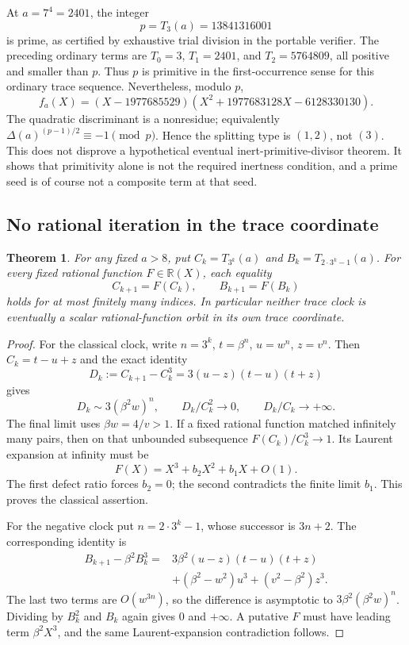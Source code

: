 \documentclass[11pt,a4paper]{article}
\newtheorem{theorem}{Theorem}[section]
\theoremstyle{definition}\newtheorem{definition}[theorem]{Definition}
\theoremstyle{remark}\newtheorem{remark}[theorem]{Remark}
\newcommand{\R}{\mathbb R}\newcommand{\C}{\mathbb C}\newcommand{\F}{\mathbb F}
\begin{document}
At $a=7^4=2401$, the integer
\[
 p=T_3(a)=13841316001
\]
is prime, as certified by exhaustive trial division in the portable
verifier. The preceding ordinary terms are
$T_0=3$, $T_1=2401$, and $T_2=5764809$, all positive and smaller than
$p$. Thus $p$ is primitive in the first-occurrence sense for this
ordinary trace sequence. Nevertheless, modulo $p$,
\begin{equation}\label{R16:eq:mixedexample}
 f_a(X)=(X-1977685529)
 (X^2+1977683128X-6128330130).
\end{equation}
The quadratic discriminant is a nonresidue; equivalently
$\Delta(a)^{(p-1)/2}\equiv-1\pmod p$. Hence the splitting type is
$(1,2)$, not $(3)$. This does not disprove a hypothetical eventual
inert-primitive-divisor theorem. It shows that primitivity alone is not
the required inertness condition, and a prime seed is of course not a
composite term at that seed.

\subsection{No rational iteration in the trace coordinate}

\begin{theorem}\label{R16:thm:rational}
For any fixed $a>8$, put $C_k=T_{3^k}(a)$ and
$B_k=T_{2\cdot3^k-1}(a)$. For every fixed rational function
$F\in\R(X)$, each equality
\[
 C_{k+1}=F(C_k),\qquad B_{k+1}=F(B_k)
\]
holds for at most finitely many indices. In particular neither trace clock
is eventually a scalar rational-function orbit in its own trace coordinate.
\end{theorem}
\begin{proof}
For the classical clock, write $n=3^k$, $t=\beta^n$, $u=w^n$,
$z=v^n$. Then $C_k=t-u+z$ and the exact identity
\begin{equation}\label{R16:eq:defect}
 D_k:=C_{k+1}-C_k^3=3(u-z)(t-u)(t+z)
\end{equation}
gives
\[
 D_k\sim3(\beta^2w)^n,\qquad
 D_k/C_k^2\longrightarrow0,\qquad D_k/C_k\longrightarrow+\infty.
\]
The final limit uses $\beta w=4/v>1$. If a fixed rational function
matched infinitely many pairs, then on that unbounded subsequence
$F(C_k)/C_k^3\to1$. Its Laurent expansion at infinity must be
\[
 F(X)=X^3+b_2X^2+b_1X+O(1).
\]
The first defect ratio forces $b_2=0$; the second contradicts the finite
limit $b_1$. This proves the classical assertion.

For the negative clock put $n=2\cdot3^k-1$, whose successor is $3n+2$.
The corresponding identity is
\begin{align*}
 B_{k+1}-\beta^2 B_k^3
 ={}&3\beta^2(u-z)(t-u)(t+z)\\
 &+(\beta^2-w^2)u^3+(v^2-\beta^2)z^3.
\end{align*}
The last two terms are $O(w^{3n})$, so the difference is asymptotic to
$3\beta^2(\beta^2w)^n$. Dividing by $B_k^2$ and $B_k$ again gives
$0$ and $+\infty$. A putative $F$ must have leading term
$\beta^2X^3$, and the same Laurent-expansion contradiction follows.
\end{proof}
\end{document}
